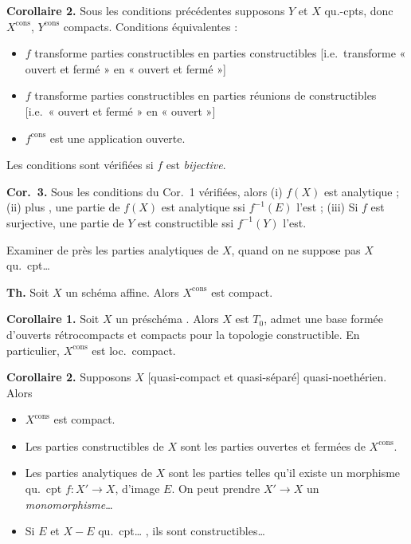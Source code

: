 \documentclass[11pt,a4paper]{article}
\begin{document}

\textbf{Corollaire 2.} Sous les conditions précédentes  supposons $Y$ et $X$ qu.-cpts, donc $X^{\mathrm{cons}}$, $Y^{\mathrm{cons}}$ compacts. Conditions équivalentes :
\begin{itemize}
\item[(a)] $f$ transforme parties constructibles en parties constructibles [i.e.\ transforme « ouvert et fermé » en « ouvert et fermé »]
\item[(b)] $f$ transforme parties constructibles en parties réunions de constructibles [i.e.\ « ouvert et fermé » en « ouvert »]
\item[(c)] $f^{\mathrm{cons}}$ est une application ouverte. \struck{\ill{} \ill{} \ill{}}
\end{itemize}
Les conditions sont vérifiées si $f$ est \emph{bijective}.

\textbf{Cor.~3.} Sous les conditions du Cor.~1  vérifiées, alors (i) $f(X)$ est  analytique ; (ii) plus , une partie  de $f(X)$ est analytique ssi $f^{-1}(E)$ l'est ; (iii) Si $f$ est surjective, une partie \ill{} \ill{} de $Y$ est constructible ssi $f^{-1}(Y)$ l'est.

Examiner  de près les parties analytiques  de $X$, quand on ne suppose pas $X$ qu.\ cpt\ldots

\textbf{Th.} Soit $X$ un schéma affine. Alors $X^{\mathrm{cons}}$ est compact.

\textbf{Corollaire 1.} Soit $X$ un préschéma \struck{\ill{}} . Alors $X$ est $T_0$, admet une base formée d'ouverts rétrocompacts et compacts pour la topologie constructible.  En particulier, $X^{\mathrm{cons}}$ est loc.\ compact.

\textbf{Corollaire 2.} Supposons  $X$ [quasi-compact et quasi-séparé]  quasi-noethérien. Alors
\begin{itemize}
\item[(i)] $X^{\mathrm{cons}}$ est compact.
\item[(ii)] Les parties constructibles de $X$ sont les parties ouvertes et fermées de $X^{\mathrm{cons}}$.
\item[(iii)] Les parties  analytiques de $X$ sont les parties  telles qu'il existe un morphisme qu.\ cpt $f:X'\to X$, d'image $E$. On peut prendre   $X'\to X$ un \emph{monomorphisme}\ldots
\item[(iv)] Si $E$ et $X-E$ \struck{[N.B.\ \ill{}]}  qu.\ cpt\ldots{} \ill{} \ill{}, ils sont constructibles\ldots
\end{itemize}
\end{document}
